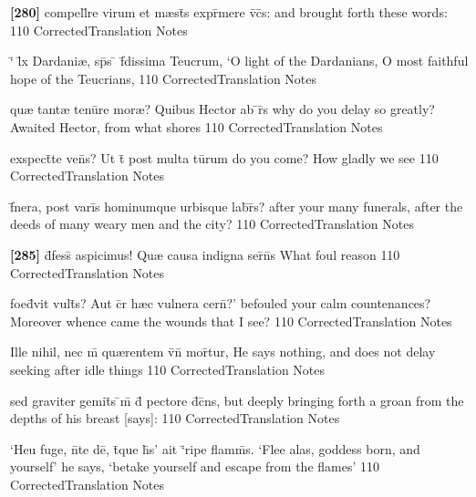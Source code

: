 \latline
  {\textbf{[280]} compell\={}re virum et m{\ae}st\={}s expr\={}mere v\={}c\={}s:}
  { and brought forth these words: }
  {110}
  { CorrectedTranslation }
  { Notes }


\latline
  {`\={} l\={}x Dardani{\ae}, sp\={}s \={} f\={\macron {\i}}dissima Teucrum,}
  { `O light of the Dardanians, O most faithful hope of the Teucrians, }
  {110}
  { CorrectedTranslation }
  { Notes }


\latline
  {qu{\ae} tant{\ae} tenu\={}re mor{\ae}?  Quibus Hector ab \={}r\={\macron {\i}}s}
  { why do you delay so greatly?  Awaited Hector, from what shores }
  {110}
  { CorrectedTranslation }
  { Notes }


\latline
  {exspect\={}te ven\={\macron {\i}}s?  Ut t\={} post multa tu\={}rum}
  { do you come?  How gladly we see }
  {110}
  { CorrectedTranslation }
  { Notes }


\latline
  {f\={}nera, post vari\={}s hominumque urbisque lab\={}r\={}s?}
  { after your many funerals, after the deeds of many weary men and the city? }
  {110}
  { CorrectedTranslation }
  { Notes }


\latline
  {\textbf{[285]} d\={}fess\={\macron {\i}}  aspicimus!  Qu{\ae} causa indigna ser\={}n\={}s}
  {  What foul reason }
  {110}
  { CorrectedTranslation }
  { Notes }


\latline
  {foed\={}vit vult\={}s?  Aut c\={}r h{\ae}c vulnera cern\={}?'}
  { befouled your calm countenances?  Moreover whence came the wounds that I see? }
  {110}
  { CorrectedTranslation }
  { Notes }


\latline
  {Ille nihil, nec m\={} qu{\ae}rentem v\={}n\={} mor\={}tur,}
  { He says nothing, and does not delay seeking after idle things }
  {110}
  { CorrectedTranslation }
  { Notes }


\latline
  {sed graviter gemit\={}s \={\macron {\i}}m\={} d\={} pectore d\={}c\={}ns,}
  { but deeply bringing forth a groan from the depths of his breast [says]: }
  {110}
  { CorrectedTranslation }
  { Notes }


\latline
  {`Heu fuge, n\={}te de\={}, t\={}que h\={\macron {\i}}s' ait `\={}ripe flamm\={\macron {\i}}s.}
  { `Flee alas, goddess born, and yourself' he says, `betake yourself and escape from the flames' }
  {110}
  { CorrectedTranslation }
  { Notes }


